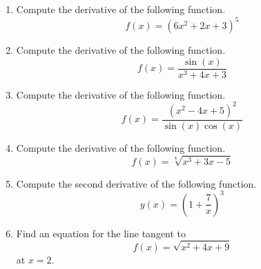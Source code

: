\documentclass{article}
\begin{document}
\ActivityTitle[class=Calculus I, number=4, name=Differentiation II (Solutions)]

\begin{enumerate}
\item Compute the derivative of the following function. \[ f(x) = (6 x^2 + 2 x + 3)^{5} \]

  
\vspace{1cm}

\item Compute the derivative of the following function. \[ f(x) = \frac{\sin(x)}{x^3 + 4 x + 3} \]

  
\vspace{1cm}

\item Compute the derivative of the following function. \[ f(x) = \frac{(x^2 - 4 x + 5)^{2}}{\sin(x)\cos(x)} \]

  
\vspace{1cm}

\item Compute the derivative of the following function. \[ f(x) = \sqrt[4]{x^3 + 3 x - 5} \]

  
\vspace{1cm}

\item Compute the second derivative of the following function. \[ y(x) = \left( 1 + \frac{7}{x} \right)^{3} \]

  
\vspace{1cm}

\item Find an equation for the line tangent to \[ f(x) = \sqrt{x^2 + 4 x + 9} \] at $x = 2$.

  
\vspace{1cm}
\end{enumerate}
\end{document}
